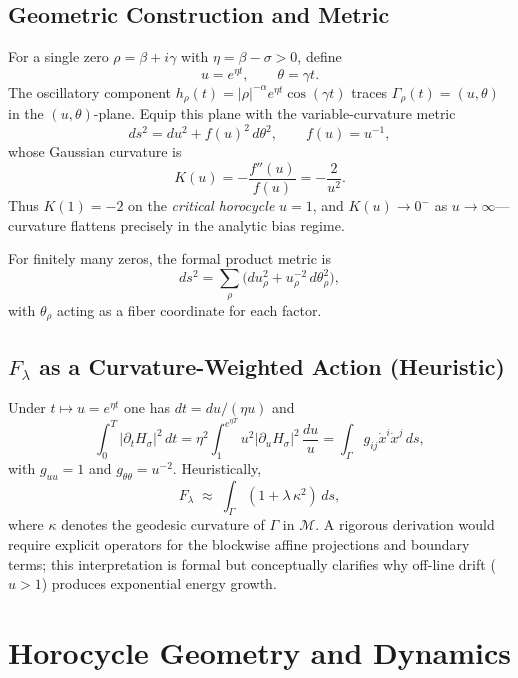 \subsection{Geometric Construction and Metric}

For a single zero $\rho=\beta+i\gamma$ with $\eta=\beta-\sigma>0$, define
\[
u = e^{\eta t}, \qquad \theta = \gamma t .
\]
The oscillatory component
$h_\rho(t)=|\rho|^{-\alpha} e^{\eta t}\cos(\gamma t)$ traces
$\Gamma_\rho(t)=(u,\theta)$ in the $(u,\theta)$-plane.
Equip this plane with the variable-curvature metric
\begin{equation}
ds^2 = du^2 + f(u)^2\, d\theta^2, \qquad f(u)=u^{-1},
\tag{16.1}
\end{equation}
whose Gaussian curvature is
\begin{equation}
K(u)=-\frac{f''(u)}{f(u)}=-\frac{2}{u^2}.
\tag{16.2}
\end{equation}
Thus $K(1)=-2$ on the \emph{critical horocycle} $u=1$, and $K(u)\!\to\!0^-$ as
$u\!\to\!\infty$—curvature flattens precisely in the analytic bias regime.

For finitely many zeros, the formal product metric is
\begin{equation}
ds^2=\sum_\rho \bigl(du_\rho^2 + u_\rho^{-2}\, d\theta_\rho^2\bigr),
\tag{16.3}
\end{equation}
with $\theta_\rho$ acting as a fiber coordinate for each factor.

\subsection{\texorpdfstring{$F_\lambda$}{Fλ} as a Curvature-Weighted Action (Heuristic)}

Under $t\mapsto u=e^{\eta t}$ one has $dt=du/(\eta u)$ and
\[
\int_0^T |\partial_t H_\sigma|^2\,dt
  = \eta^2\!\!\int_{1}^{e^{\eta T}} u^2|\partial_u H_\sigma|^2\,\frac{du}{u}
  = \int_\Gamma g_{ij}\dot{x}^i\dot{x}^j\,ds,
\]
with $g_{uu}=1$ and $g_{\theta\theta}=u^{-2}$.
Heuristically,
\[
F_\lambda \;\approx\; \int_\Gamma (1+\lambda\,\kappa^2)\,ds ,
\]
where $\kappa$ denotes the geodesic curvature of $\Gamma$ in $\mathcal{M}$.
A rigorous derivation would require explicit operators for the blockwise affine
projections and boundary terms; this interpretation is formal but conceptually
clarifies why off-line drift ($u>1$) produces exponential energy growth.

\section{Horocycle Geometry and Dynamics}\label{sec:horocycle}

